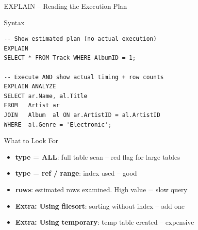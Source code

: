 \begin{frame}[fragile]{EXPLAIN -- Reading the Execution Plan}
  \begin{block}{Syntax}
\begin{lstlisting}[style=sqlstyle]
-- Show estimated plan (no actual execution)
EXPLAIN
SELECT * FROM Track WHERE AlbumID = 1;

-- Execute AND show actual timing + row counts
EXPLAIN ANALYZE
SELECT ar.Name, al.Title
FROM   Artist ar
JOIN   Album  al ON ar.ArtistID = al.ArtistID
WHERE  al.Genre = 'Electronic';
\end{lstlisting}
  \end{block}

  \begin{block}{What to Look For}
    \begin{itemize}
      \item \textbf{type = ALL}: full table scan -- red flag for large tables
      \item \textbf{type = ref / range}: index used -- good
      \item \textbf{rows}: estimated rows examined. High value = slow query
      \item \textbf{Extra: Using filesort}: sorting without index -- add one
      \item \textbf{Extra: Using temporary}: temp table created -- expensive
    \end{itemize}
  \end{block}
\end{frame}

